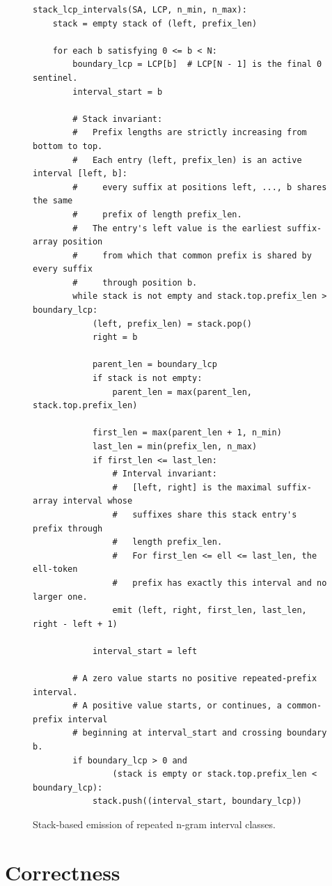 \documentclass[11pt]{article}
\begin{document}
\begin{figure}[p]
\scriptsize
\begin{verbatim}
stack_lcp_intervals(SA, LCP, n_min, n_max):
    stack = empty stack of (left, prefix_len)

    for each b satisfying 0 <= b < N:
        boundary_lcp = LCP[b]  # LCP[N - 1] is the final 0 sentinel.
        interval_start = b

        # Stack invariant:
        #   Prefix lengths are strictly increasing from bottom to top.
        #   Each entry (left, prefix_len) is an active interval [left, b]:
        #     every suffix at positions left, ..., b shares the same
        #     prefix of length prefix_len.
        #   The entry's left value is the earliest suffix-array position
        #     from which that common prefix is shared by every suffix
        #     through position b.
        while stack is not empty and stack.top.prefix_len > boundary_lcp:
            (left, prefix_len) = stack.pop()
            right = b

            parent_len = boundary_lcp
            if stack is not empty:
                parent_len = max(parent_len, stack.top.prefix_len)

            first_len = max(parent_len + 1, n_min)
            last_len = min(prefix_len, n_max)
            if first_len <= last_len:
                # Interval invariant:
                #   [left, right] is the maximal suffix-array interval whose
                #   suffixes share this stack entry's prefix through
                #   length prefix_len.
                #   For first_len <= ell <= last_len, the ell-token
                #   prefix has exactly this interval and no larger one.
                emit (left, right, first_len, last_len, right - left + 1)

            interval_start = left

        # A zero value starts no positive repeated-prefix interval.
        # A positive value starts, or continues, a common-prefix interval
        # beginning at interval_start and crossing boundary b.
        if boundary_lcp > 0 and
                (stack is empty or stack.top.prefix_len < boundary_lcp):
            stack.push((interval_start, boundary_lcp))
\end{verbatim}
\caption{Stack-based emission of repeated n-gram interval classes.}
\end{figure}

\section{Correctness}
\end{document}
